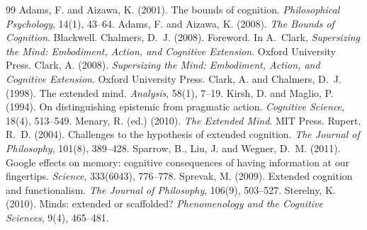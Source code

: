 \documentclass{situationist-preprint}
\begin{document}
\begin{thebibliography}{99}\small
{} Adams, F. and Aizawa, K. (2001). The bounds of cognition. \emph{Philosophical Psychology}, 14(1), 43--64.
 Adams, F. and Aizawa, K. (2008). \emph{The Bounds of Cognition}. Blackwell.
 Chalmers, D.~J. (2008). Foreword. In A.~Clark, \emph{Supersizing the Mind: Embodiment, Action, and Cognitive Extension}. Oxford University Press.
 Clark, A. (2008). \emph{Supersizing the Mind: Embodiment, Action, and Cognitive Extension}. Oxford University Press.
 Clark, A. and Chalmers, D.~J. (1998). The extended mind. \emph{Analysis}, 58(1), 7--19.
 Kirsh, D. and Maglio, P. (1994). On distinguishing epistemic from pragmatic action. \emph{Cognitive Science}, 18(4), 513--549.
 Menary, R. (ed.) (2010). \emph{The Extended Mind}. MIT Press.
 Rupert, R.~D. (2004). Challenges to the hypothesis of extended cognition. \emph{The Journal of Philosophy}, 101(8), 389--428.
 Sparrow, B., Liu, J. and Wegner, D.~M. (2011). Google effects on memory: cognitive consequences of having information at our fingertips. \emph{Science}, 333(6043), 776--778.
 Sprevak, M. (2009). Extended cognition and functionalism. \emph{The Journal of Philosophy}, 106(9), 503--527.
 Sterelny, K. (2010). Minds: extended or scaffolded? \emph{Phenomenology and the Cognitive Sciences}, 9(4), 465--481.
\end{thebibliography}
\end{document}

